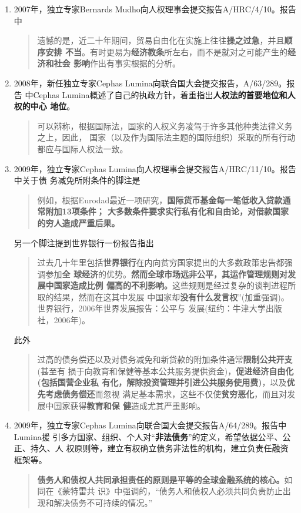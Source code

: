 \begin{enumerate}
\item 2007年，独立专家Bernards Mudho向人权理事会提交报告A/HRC/4/10。报告中
  \begin{quotation}
    遗憾的是，近二十年期间，贸易自由化在实施上往往\textbf{操之过急}，并且\textbf{顺序安排
      不当}。有时更易为\textbf{经济教条}所左右，而不是就对之可能产生的\textbf{经济和社会
      影响}作出有事实根据的分析。
  \end{quotation}


\item 2008年，新任独立专家Cephas Lumina向联合国大会提交报告，A/63/289。报告
  中Cephas Lumina概述了自己的执政方针，着重指出\textbf{人权法的首要地位和人权的中心
    地位}。
  \begin{quotation}
    可以辩称，根据国际法，国家的人权义务凌驾于许多其他种类法律义务之上，因此，
    国家（以及作为国际法主题的国际组织）采取的所有行动都应与国际人权法一致。
  \end{quotation}

\item 2009年，独立专家Cephas Lumina向人权理事会提交报告A/HRC/11/10。报告中关于债
  务减免所附条件的脚注是
  \begin{quotation}
    例如，根据Eurodad最近一项研究，\textbf{国际货币基金每一笔低收入贷款通常附加13项条件；
    大多数条件要求实行私有化和自由论，对借款国家的穷人造成严重后果。}
\end{quotation}

另一个脚注提到世界银行一份报告指出
\begin{quotation}
  过去几十年里包括\textbf{世界银行}在内向贫穷国家提出的大多数政策忠告都强调参加\textbf{全
    球经济}的优势。\textbf{然而全球市场远非公平，其运作管理规则对发展中国家造成比例
    偏高的不利影响。}这些规则是经过复杂的谈判进程所取的结果，然而在这其中发展
  中国家却\textbf{没有什么发言权}”(加重强调)。世界银行，2006年世界发展报告：公平与
  发展(纽约：牛津大学出版社，2006年)。
\end{quotation}

此外
\begin{quotation}
  过高的债务偿还以及对债务减免和新贷款的附加条件通常\textbf{限制公共开支}(甚至有
  损于向教育和保健等基本公共服务提供资金)，\textbf{促进经济自由化(包括国营企业私
    有化，解除投资管理并引进公共服务使用费)}，以及\textbf{优先考虑债务偿还}而忽视
  满足基本需求，这些不仅使\textbf{贫穷恶化}，而且对发展中国家获得\textbf{教育和保
    健}造成尤其严重影响。
  \end{quotation}

\item 2009年，独立专家Cephas Lumina向联合国大会提交报告A/64/289。报告中Lumina援
  引多方国家、组织、个人对“\textbf{非法债务}”的定义，希望依据公平、公正、持久、人
  权原则等，建立有权确立债务非法性的机构，建立负责任融资框架等。
  \begin{quotation}
    \textbf{债务人和债权人共同承担责任的原则是平等的全球金融系统的核心。}如同在《蒙特雷共
    识》中强调的，“债务人和债权人必须共同负责防止出现和解决债务不可持续的情况。”
  \end{quotation}


\end{enumerate}
